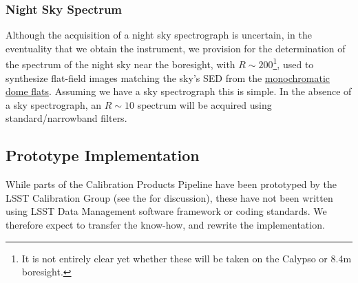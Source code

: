  
\subsubsection{Night Sky Spectrum}\label{sec:CPP:aux:nightSkySpectrum}
Although the acquisition of a night sky spectrograph is uncertain, in the eventuality that we obtain the instrument, we provision for the determination of the spectrum of the night sky near the \auxtelescope boresight, with $R \sim 200$\footnote{It is not entirely clear yet whether these will be taken on the Calypso or 8.4m boresight.}, used to synthesize flat-field images matching the sky's SED from the \hyperref[sec:CPP:output:monoFlat]{monochromatic dome flats}.
\alg Assuming we have a sky spectrograph this is simple. In the absence of a sky spectrograph, an $R \sim 10$ spectrum will be acquired using standard/narrowband filters.









\subsection{Prototype Implementation}
\label{sec:CPP:prototypeImplementation}
While parts of the Calibration Products Pipeline have been prototyped by the LSST Calibration Group (see the \NewPCP for discussion), these have not been written using LSST Data Management software framework or coding standards. We therefore expect to transfer the know-how, and rewrite the implementation.












%

